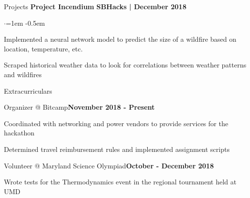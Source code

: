 \documentclass{resume} %
\begin{document}
\begin{rSection}{Projects}
{\bf Project Incendium}  \hfill {\bf SBHacks | December 2018}
\begin{list}{$\cdot$}{\leftmargin=1em} %
\itemsep -0.5em \vspace{-0.5em} %
	\item 
		Implemented a neural network model to predict the size of a wildfire based on location, temperature, etc.
	\item
		Scraped historical weather data to look for correlations between weather patterns and wildfires
\end{list}

\end{rSection}



\begin{rSection}{Extracurriculars} 

	\begin{rSubsection}{Organizer @ Bitcamp}{\textbf{November 2018 - Present}}{}{}
		\item Coordinated with networking and power vendors to provide services for the hackathon
		\item Determined travel reimbursement rules and implemented assignment scripts

	\end{rSubsection}

	\begin{rSubsection}{Volunteer @ Maryland Science Olympiad}{\textbf{October - December 2018}}{}{}
		\item Wrote tests for the Thermodynamics event in the regional tournament held at UMD
	\end{rSubsection}

\end{rSection}
\end{document}
